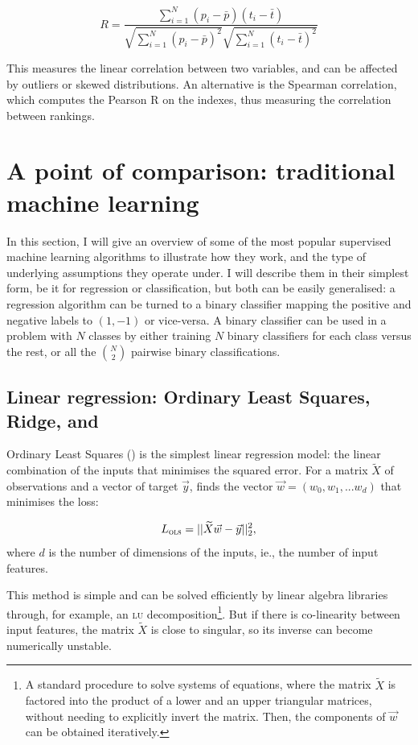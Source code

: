 \begin{equation*}
R = \frac{\sum_{i=1}^N (p_i - \bar{p}) (t_i - \bar t)}{\sqrt{\sum_{i=1}^N (p_i - \bar{p})^2} \sqrt{\sum_{i=1}^N(t_i - \bar t)^2}}
\end{equation*}

This measures the linear correlation between two variables, and can be affected by outliers or skewed distributions. 
An alternative is the Spearman correlation, which computes the Pearson R on the indexes, thus measuring the correlation between rankings.

\section[Traditional machine learning]{A point of comparison: traditional machine learning}
In this section, I will give an overview of some of the most popular supervised machine learning algorithms to illustrate how they work, and the type of underlying assumptions they operate under.
I will describe them in their simplest form, be it for regression or classification, but both can be easily generalised: a regression algorithm can be turned to a binary classifier mapping the positive and negative labels to $(1, -1)$ or vice-versa.
A binary classifier can be used in a problem with $N$ classes by either training $N$ binary classifiers for each class versus the rest, or all the $\binom{N}{2}$ pairwise binary classifications.

\subsection[Linear regression]{Linear regression: Ordinary Least Squares, Ridge, and \LASSO}\label{sec:linear}
Ordinary Least Squares (\OLS) is the simplest linear regression model: the linear combination of the inputs that minimises the squared error.
For a matrix $ \widetilde X$ of observations and a vector of target $\vec y$, \OLS{} finds the vector $\vec w = (w_0, w_1, ... w_d)$ that minimises the loss:

\begin{equation*}
 L_{\textsc{ols}} = || \widetilde  X \vec w - \vec y ||_2 ^2,
\end{equation*}
where $d$ is the number of dimensions of the inputs, ie., the number of input features.

This method is simple and can be solved efficiently by linear algebra libraries through, for example, an \textsc{lu}{} decomposition\footnote{A standard procedure to solve systems of equations, where the matrix $\widetilde{X}$ is factored into the product of a lower and an upper triangular matrices, without needing to explicitly invert the matrix. Then, the components of $\vec w$ can be obtained iteratively.}.
But if there is co-linearity between input features, the matrix $ \widetilde X$ is close to singular, so its inverse can become numerically unstable.

